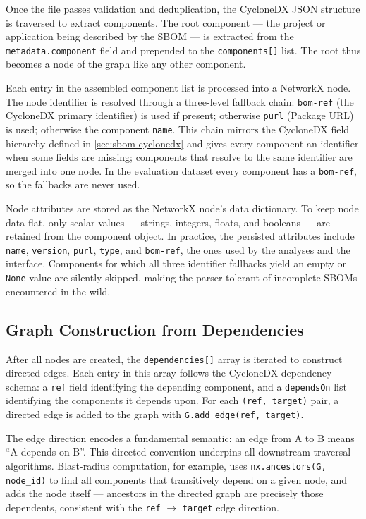 Once the file passes validation and deduplication, the CycloneDX JSON structure is traversed to extract components. The root component --- the project or application being described by the SBOM --- is extracted from the \texttt{metadata.component} field and prepended to the \texttt{components[]} list. The root thus becomes a node of the graph like any other component.

Each entry in the assembled component list is processed into a NetworkX node. The node identifier is resolved through a three-level fallback chain: \texttt{bom-ref} (the CycloneDX primary identifier) is used if present; otherwise \texttt{purl} (Package URL) is used; otherwise the component \texttt{name}. This chain mirrors the CycloneDX field hierarchy defined in \autoref{sec:sbom-cyclonedx} and gives every component an identifier when some fields are missing; components that resolve to the same identifier are merged into one node. In the evaluation dataset every component has a \texttt{bom-ref}, so the fallbacks are never used.

Node attributes are stored as the NetworkX node's data dictionary. To keep node data flat, only scalar values --- strings, integers, floats, and booleans --- are retained from the component object. In practice, the persisted attributes include \texttt{name}, \texttt{version}, \texttt{purl}, \texttt{type}, and \texttt{bom-ref}, the ones used by the analyses and the interface. Components for which all three identifier fallbacks yield an empty or \texttt{None} value are silently skipped, making the parser tolerant of incomplete SBOMs encountered in the wild.


\subsection{Graph Construction from Dependencies}
\label{sec:graph-construction}

After all nodes are created, the \texttt{dependencies[]} array is iterated to construct directed edges. Each entry in this array follows the CycloneDX dependency schema: a \texttt{ref} field identifying the depending component, and a \texttt{dependsOn} list identifying the components it depends upon. For each \texttt{(ref, target)} pair, a directed edge is added to the graph with \texttt{G.add\_edge(ref, target)}.

The edge direction encodes a fundamental semantic: an edge from A to B means ``A depends on B''. This directed convention underpins all downstream traversal algorithms. Blast-radius computation, for example, uses \texttt{nx.ancestors(G, node\_id)} to find all components that transitively depend on a given node, and adds the node itself --- ancestors in the directed graph are precisely those dependents, consistent with the \texttt{ref} \(\to\) \texttt{target} edge direction.

